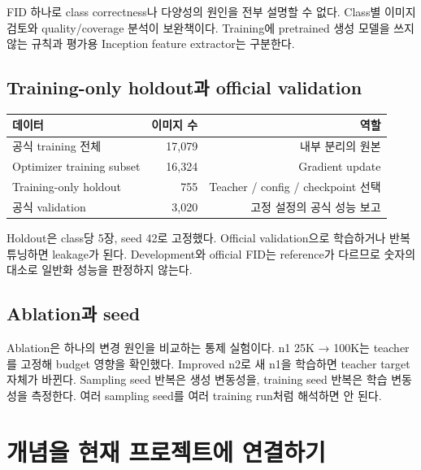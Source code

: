 \documentclass[11pt,a4paper]{article}
\begin{document}
FID 하나로 class correctness나 다양성의 원인을 전부 설명할 수 없다. Class별 이미지 검토와 quality/coverage 분석이 보완책이다. Training에 pretrained 생성 모델을 쓰지 않는 규칙과 평가용 Inception feature extractor는 구분한다.

\subsection{Training-only holdout과 official validation}
\begin{center}
\begin{tabular}{lrr}
\toprule 데이터 & 이미지 수 & 역할 \\\midrule
공식 training 전체 & 17,079 & 내부 분리의 원본 \\
Optimizer training subset & 16,324 & Gradient update \\
Training-only holdout & 755 & Teacher / config / checkpoint 선택 \\
공식 validation & 3,020 & 고정 설정의 공식 성능 보고 \\
\bottomrule
\end{tabular}
\end{center}
Holdout은 class당 5장, seed 42로 고정했다. Official validation으로 학습하거나 반복 튜닝하면 leakage가 된다. Development와 official FID는 reference가 다르므로 숫자의 대소로 일반화 성능을 판정하지 않는다.

\subsection{Ablation과 seed}
Ablation은 하나의 변경 원인을 비교하는 통제 실험이다. n1 25K → 100K는 teacher를 고정해 budget 영향을 확인했다. Improved n2로 새 n1을 학습하면 teacher target 자체가 바뀐다. Sampling seed 반복은 생성 변동성을, training seed 반복은 학습 변동성을 측정한다. 여러 sampling seed를 여러 training run처럼 해석하면 안 된다.

\section{개념을 현재 프로젝트에 연결하기}
\end{document}
